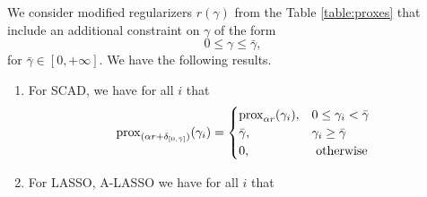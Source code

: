 \begin{theorem}     \label{thm:prox_of_positive_quadrant}
We consider modified regularizers $r(\gamma)$ from the Table \ref{table:proxes} 
that include an additional constraint on $\gamma$ of the form 
\[
0 \leq \gamma \leq \bar\gamma,
\]
for $\bar\gamma\in[0,+\infty]$.
We have the following results. 
    \begin{enumerate}
    \item  For SCAD, we have for all $i$ that  
\[
    \prox_{(\alpha r + \del_{[0,\bgam]})} %
    (\gamma_{i}) = \begin{cases} 
        \prox_{\alpha r}(\gamma_i), & 0 \leq \gamma_i < \bar\gamma  \\
        \bar\gamma, & \gamma_i \geq \bar\gamma \\
        0, & \text{ otherwise} \end{cases}
\]
    \item  For LASSO, A-LASSO we have for all $i$ that 

\end{enumerate}
\end{theorem}
